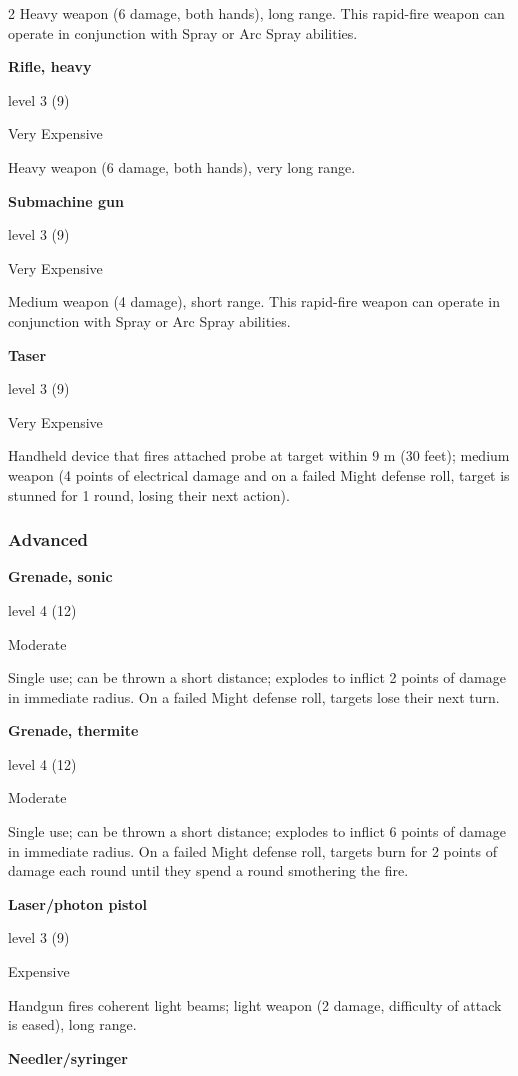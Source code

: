 \begin{multicols}{2}
Heavy weapon (6 damage, both hands), long range. This rapid-fire weapon can operate in conjunction with Spray or Arc Spray abilities. 

\textbf{Rifle, heavy} 

level 3 (9) 

Very Expensive 

Heavy weapon (6 damage, both hands), very long range. 

\textbf{Submachine gun} 

level 3 (9) 

Very Expensive 

Medium weapon (4 damage), short range. This rapid-fire weapon can operate in conjunction with Spray or Arc Spray abilities. 

\textbf{Taser} 

level 3 (9)

Very Expensive 

Handheld device that fires attached probe at target within 9 m (30 feet); medium weapon (4 points of electrical damage and on a failed Might defense roll, target is stunned for 1 round, losing their next action).

\subsubsection{Advanced}

\textbf{Grenade, sonic} 

level 4 (12) 

Moderate 

Single use; can be thrown a short distance; explodes to inflict 2 points of damage in immediate radius. On a failed Might defense roll, targets lose their next turn. 

\textbf{Grenade, thermite} 

level 4 (12) 

Moderate 

Single use; can be thrown a short distance; explodes to inflict 6 points of damage in immediate radius. On a failed Might defense roll, targets burn for 2 points of damage each round until they spend a round smothering the fire.

\textbf{Laser/photon pistol}

level 3 (9) 

Expensive 

Handgun fires coherent light beams; light weapon (2 damage, difficulty of attack is eased), long range. 

\textbf{Needler/syringer} 


\end{multicols}
